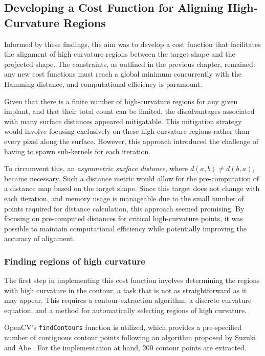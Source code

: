 \subsection{Developing a Cost Function for Aligning High-Curvature Regions}

Informed by these findings, the aim was to develop a cost function that facilitates the alignment of high-curvature regions between the target shape and the projected shape.
The constraints, as outlined in the previous chapter, remained: any new cost functions must reach a global minimum concurrently with the Hamming distance, and computational efficiency is paramount.

Given that there is a finite number of high-curvature regions for any given implant, and that their total count can be limited, the disadvantages associated with many surface distances appeared mitigatable.
This mitigation strategy would involve focusing exclusively on these high-curvature regions rather than every pixel along the surface.
However, this approach introduced the challenge of having to spawn sub-kernels for each iteration.

To circumvent this, an \emph{asymmetric surface distance}, where $d(a,b) \ne d(b,a)$, became necessary.
Such a distance metric would allow for the pre-computation of a distance map based on the target shape.
Since this target does not change with each iteration, and memory usage is manageable due to the small number of points required for distance calculation, this approach seemed promising.
By focusing on pre-computed distances for critical high-curvature points, it was possible to maintain computational efficiency while potentially improving the accuracy of alignment.


\subsubsection{Finding regions of high curvature}
The first step in implementing this cost function involves determining the regions with high curvature in the contour, a task that is not as straightforward as it may appear.
This requires a contour-extraction algorithm, a discrete curvature equation, and a method for automatically selecting regions of high curvature.

OpenCV's \texttt{findContours} function \cite{bradskiOpenCVLibrary2000} is utilized, which provides a pre-specified number of contiguous contour points following an algorithm proposed by Suzuki and Abe \cite{suzukiTopologicalStructuralAnalysis1985}.
For the implementation at hand, 200 contour points are extracted.


